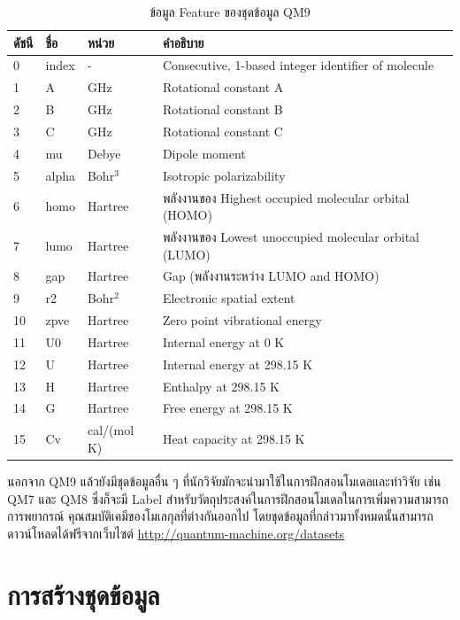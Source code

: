 \begin{table}[H]
    \centering
    \caption{ข้อมูล Feature ของชุดข้อมูล QM9}
    \label{tab:qm9_feature}
    \small
    \begin{tabular}{llll}\toprule
    \textbf{ดัชนี} &\textbf{ชื่อ} &\textbf{หน่วย} &\textbf{คำอธิบาย} \\\midrule
    0 &index &- &Consecutive, 1-based integer identifier of molecule \\
    1 &A &GHz &Rotational constant A \\
    2 &B &GHz &Rotational constant B \\
    3 &C &GHz &Rotational constant C \\
    4 &mu &Debye &Dipole moment \\
    5 &alpha &Bohr$^3$ &Isotropic polarizability \\
    6 &homo &Hartree &พลังงานของ Highest occupied molecular orbital (HOMO) \\
    7 &lumo &Hartree &พลังงานของ Lowest unoccupied molecular orbital (LUMO) \\
    8 &gap &Hartree &Gap (พลังงานระหว่าง LUMO and HOMO) \\
    9 &r2 &Bohr$^2$ &Electronic spatial extent \\
    10 &zpve &Hartree &Zero point vibrational energy \\
    11 &U0 &Hartree &Internal energy at 0 K \\
    12 &U &Hartree &Internal energy at 298.15 K \\
    13 &H &Hartree &Enthalpy at 298.15 K \\
    14 &G &Hartree &Free energy at 298.15 K \\
    15 &Cv &cal/(mol K) &Heat capacity at 298.15 K \\
    \bottomrule
    \end{tabular}
\end{table}

นอกจาก QM9 แล้วยังมีชุดข้อมูลอื่น ๆ ที่นักวิจัยมักจะนำมาใช้ในการฝึกสอนโมเดลและทำวิจัย เช่น QM7\autocite{blum2009,rupp2012a} และ 
QM8\autocite{ruddigkeit2012,ramakrishnan2015} ซึ่งก็จะมี Label สำหรับวัตถุประสงค์ในการฝึกสอนโมเดลในการเพิ่มความสามารถการพยากรณ์%
คุณสมบัติเคมีของโมเลกุลที่ต่างกันออกไป โดยชุดข้อมูลที่กล่าวมาทั้งหมดนั้นสามารถดาวน์โหลดได้ฟรีจากเว็บไซต์ 
\url{http://quantum-machine.org/datasets}

\section{การสร้างชุดข้อมูล}

